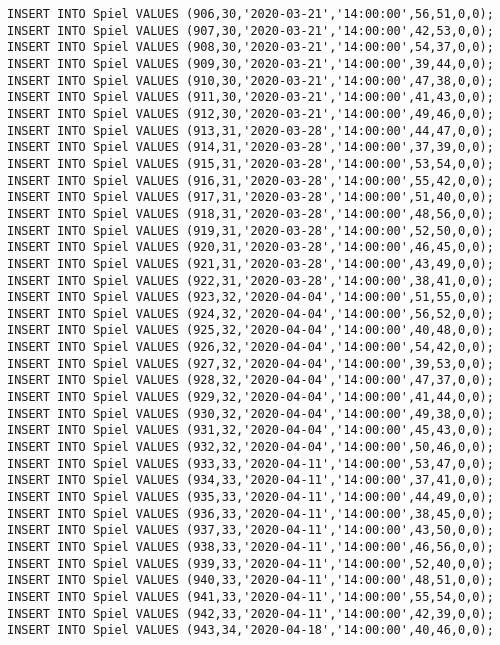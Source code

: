 \documentclass{bschlangaul-aufgabe}
\begin{document}
\begin{verbatim}
INSERT INTO Spiel VALUES (906,30,'2020-03-21','14:00:00',56,51,0,0);
INSERT INTO Spiel VALUES (907,30,'2020-03-21','14:00:00',42,53,0,0);
INSERT INTO Spiel VALUES (908,30,'2020-03-21','14:00:00',54,37,0,0);
INSERT INTO Spiel VALUES (909,30,'2020-03-21','14:00:00',39,44,0,0);
INSERT INTO Spiel VALUES (910,30,'2020-03-21','14:00:00',47,38,0,0);
INSERT INTO Spiel VALUES (911,30,'2020-03-21','14:00:00',41,43,0,0);
INSERT INTO Spiel VALUES (912,30,'2020-03-21','14:00:00',49,46,0,0);
INSERT INTO Spiel VALUES (913,31,'2020-03-28','14:00:00',44,47,0,0);
INSERT INTO Spiel VALUES (914,31,'2020-03-28','14:00:00',37,39,0,0);
INSERT INTO Spiel VALUES (915,31,'2020-03-28','14:00:00',53,54,0,0);
INSERT INTO Spiel VALUES (916,31,'2020-03-28','14:00:00',55,42,0,0);
INSERT INTO Spiel VALUES (917,31,'2020-03-28','14:00:00',51,40,0,0);
INSERT INTO Spiel VALUES (918,31,'2020-03-28','14:00:00',48,56,0,0);
INSERT INTO Spiel VALUES (919,31,'2020-03-28','14:00:00',52,50,0,0);
INSERT INTO Spiel VALUES (920,31,'2020-03-28','14:00:00',46,45,0,0);
INSERT INTO Spiel VALUES (921,31,'2020-03-28','14:00:00',43,49,0,0);
INSERT INTO Spiel VALUES (922,31,'2020-03-28','14:00:00',38,41,0,0);
INSERT INTO Spiel VALUES (923,32,'2020-04-04','14:00:00',51,55,0,0);
INSERT INTO Spiel VALUES (924,32,'2020-04-04','14:00:00',56,52,0,0);
INSERT INTO Spiel VALUES (925,32,'2020-04-04','14:00:00',40,48,0,0);
INSERT INTO Spiel VALUES (926,32,'2020-04-04','14:00:00',54,42,0,0);
INSERT INTO Spiel VALUES (927,32,'2020-04-04','14:00:00',39,53,0,0);
INSERT INTO Spiel VALUES (928,32,'2020-04-04','14:00:00',47,37,0,0);
INSERT INTO Spiel VALUES (929,32,'2020-04-04','14:00:00',41,44,0,0);
INSERT INTO Spiel VALUES (930,32,'2020-04-04','14:00:00',49,38,0,0);
INSERT INTO Spiel VALUES (931,32,'2020-04-04','14:00:00',45,43,0,0);
INSERT INTO Spiel VALUES (932,32,'2020-04-04','14:00:00',50,46,0,0);
INSERT INTO Spiel VALUES (933,33,'2020-04-11','14:00:00',53,47,0,0);
INSERT INTO Spiel VALUES (934,33,'2020-04-11','14:00:00',37,41,0,0);
INSERT INTO Spiel VALUES (935,33,'2020-04-11','14:00:00',44,49,0,0);
INSERT INTO Spiel VALUES (936,33,'2020-04-11','14:00:00',38,45,0,0);
INSERT INTO Spiel VALUES (937,33,'2020-04-11','14:00:00',43,50,0,0);
INSERT INTO Spiel VALUES (938,33,'2020-04-11','14:00:00',46,56,0,0);
INSERT INTO Spiel VALUES (939,33,'2020-04-11','14:00:00',52,40,0,0);
INSERT INTO Spiel VALUES (940,33,'2020-04-11','14:00:00',48,51,0,0);
INSERT INTO Spiel VALUES (941,33,'2020-04-11','14:00:00',55,54,0,0);
INSERT INTO Spiel VALUES (942,33,'2020-04-11','14:00:00',42,39,0,0);
INSERT INTO Spiel VALUES (943,34,'2020-04-18','14:00:00',40,46,0,0);

\end{verbatim}
\end{document}
